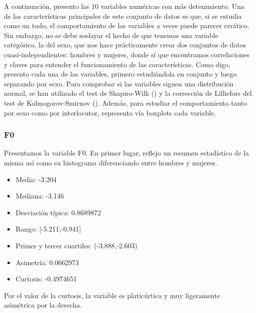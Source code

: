 A continuación, presento las 10 variables numéricas con más detenimiento. Una de las características principales de este conjunto de datos es que, si se estudia como un todo, el comportamiento de las variables a veces puede parecer errático. Sin embargo, no se debe soslayar el hecho de que tenemos una variable categórica, la del sexo, que nos hace prácticamente crear dos conjuntos de datos cuasi-independientes: hombres y mujeres, donde sí que encontramos correlaciones y claves para entender el funcionamiento de las características. Como digo, presento cada una de las variables, primero estudiándola en conjunto y luego separando por sexo. Para comprobar si las variables siguen una distribución normal, se han utilizado el test de Shapiro-Wilk (\cite{10.1093/biomet/52.3-4.591}) y la corrección de Lilliefors del test de Kolmogorov-Smirnov (\cite{10.1080/01621459.1967.10482916}). Además, para estudiar el comportamiento tanto por sexo como por interlocutor, represento vía boxplots cada variable.
\newpage

\subsubsection{F0}

Presentamos la variable F0. En primer lugar, reflejo un resumen estadístico de la misma así como su histograma diferenciando entre hombres y mujeres.
\begin{itemize}
	\item Media: -3.204
	\item Mediana: -3.146
	\item Desviación típica: 0.8689872
	\item Rango: [-5.211,-0.941]
	\item Primer y tercer cuartiles: (-3.888,-2.603)
	\item Asimetría: 0.0662973
	\item Curtosis: -0.4974651
\end{itemize}

Por el valor de la curtosis, la variable es platicúrtica y muy ligeramente asimétrica por la derecha.

